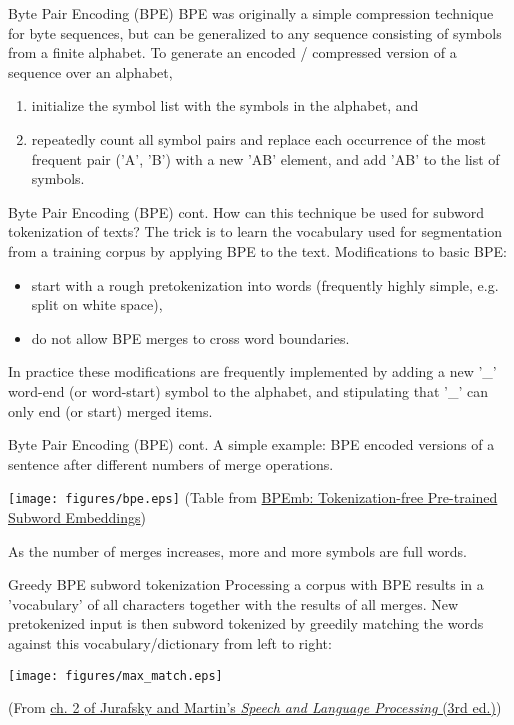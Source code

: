 \documentclass[style=upen, size=14pt]{powerdot}
\theoremstyle{definition}
\begin{document}
\begin{slide}[toc=Byte Pair Encoding]{Byte Pair Encoding (BPE)}
  BPE was originally a simple compression technique for byte sequences, but can
  be generalized to any sequence consisting of symbols from a finite alphabet.
  To generate an encoded / compressed version of a sequence over an alphabet,
  \begin{enumerate}
  \item initialize the symbol list with the symbols in the alphabet, and
  \item repeatedly count all symbol pairs and replace each occurrence of the
    most frequent pair ('A', 'B') with a new 'AB' element, and add 'AB' to the
    list of symbols.
  \end{enumerate}
\end{slide}
    
\begin{slide}[toc=]{Byte Pair Encoding (BPE) cont.}
  How can this technique be used for subword tokenization of texts? The trick is
  to learn the vocabulary used for segmentation from a training corpus by
  applying BPE to the text. Modifications to basic BPE:
  \begin{itemize}
  \item start with a rough pretokenization into words (frequently highly simple,
    e.g. split on white space),
  \item do not allow BPE merges to cross word boundaries.
  \end{itemize}
  In practice these modifications are frequently implemented by adding a new
  '\_' word-end (or word-start) symbol to the alphabet, and stipulating that
  '\_' can only end (or start) merged items.
\end{slide}

\begin{slide}[toc=]{Byte Pair Encoding (BPE) cont.}
  A simple example: BPE encoded versions of a sentence after different numbers
  of merge operations.
  \begin{center}
    \texttt{[image: figures/bpe.eps]}
    \footnotesize(Table from \href{http://www.lrec-conf.org/proceedings/lrec2018/pdf/1049.pdf}{BPEmb: Tokenization-free Pre-trained Subword Embeddings})
  \end{center}
  As the number of merges increases, more and more symbols are full words.
\end{slide}

\begin{slide}[toc=]{Greedy BPE subword tokenization}
  Processing a corpus with BPE results in a 'vocabulary' of all characters
  together with the results of all merges. New pretokenized input is then
  subword tokenized by greedily matching the words against this
  vocabulary/dictionary from left to right:

  \texttt{[image: figures/max\_match.eps]}
  
  \footnotesize(From \href{https://web.stanford.edu/~jurafsky/slp3/2.pdf}{ch. 2 of Jurafsky and Martin's \emph{Speech and Language
      Processing} (3rd ed.)})

  \end{slide}
\end{document}
